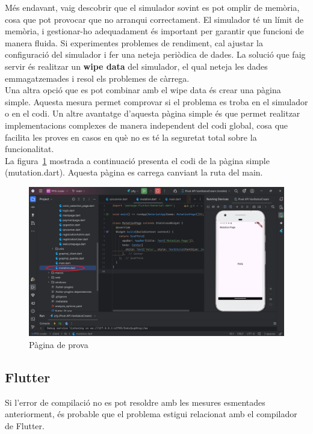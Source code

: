 \documentclass[a4paper,12pt,twoside]{ThesisStyle}
\begin{document}
Més endavant, vaig descobrir que el simulador sovint es pot omplir de memòria, cosa que pot provocar que no arranqui correctament. El simulador té un límit de memòria, i gestionar-ho adequadament és important per garantir que funcioni de manera fluida. Si experimentes problemes de rendiment, cal ajustar la configuració del simulador i fer una neteja periòdica de dades. La solució que faig servir és realitzar un \textbf{wipe data} del simulador, el qual neteja les dades emmagatzemades i resol els problemes de càrrega.\\


Una altra opció que es pot combinar amb el wipe data és crear una pàgina simple. Aquesta mesura permet comprovar si el problema es troba en el simulador o en el codi. Un altre avantatge d'aquesta pàgina simple és que permet realitzar implementacions complexes de manera independent del codi global, cosa que facilita les proves en casos en què no es té la seguretat total sobre la funcionalitat.\\

La figura~\ref{fig: pàgina de prova} mostrada a continuació presenta el codi de la pàgina simple (mutation.dart). Aquesta pàgina es carrega canviant la ruta del main.

\begin{figure}[h]
    \centering
    \includegraphics[width=1\textwidth]{imatges/hola.png}
    \caption{Pàgina de prova}
    \label{fig: pàgina de prova}
\end{figure}

\subsection{Flutter}
\label{subsec: Flutter}

Si l'error de compilació no es pot resoldre amb les mesures esmentades anteriorment, és probable que el problema estigui relacionat amb el compilador de Flutter.\\
\end{document}
